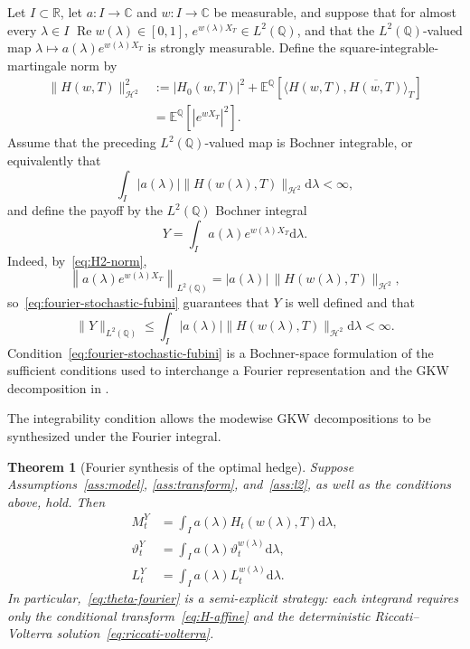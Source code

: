 \documentclass[11pt]{article}
\newtheorem{theorem}{Theorem}[section]
\theoremstyle{definition}
\theoremstyle{remark}
\newcommand{\R}{\mathbb{R}}
\newcommand{\C}{\mathbb{C}}
\newcommand{\E}{\mathbb{E}}
\newcommand{\Q}{\mathbb{Q}}
\newcommand{\1}{\mathbf{1}}
\newcommand{\dd}{\mathrm{d}}
\begin{document}
Let $I\subset\R$, let $a:I\to\C$ and $w:I\to\C$ be measurable, and suppose
that for almost every $\lambda\in I$
$\operatorname{Re}w(\lambda)\in[0,1]$,
$e^{w(\lambda)X_T}\in L^2(\Q)$, and that the $L^2(\Q)$-valued map
$\lambda\mapsto a(\lambda)e^{w(\lambda)X_T}$ is strongly measurable. Define
the square-integrable-martingale norm by
\begin{align}
 \|H(w,T)\|_{\mathcal H^2}^2
 &:=
 |H_0(w,T)|^2+
 \E^\Q\!\left[\langle H(w,T),\overline{H(w,T)}\rangle_T\right]
 \nonumber\\
 &=\E^\Q[|e^{wX_T}|^2].
 \label{eq:H2-norm}
\end{align}
Assume that the preceding $L^2(\Q)$-valued map is Bochner integrable, or
equivalently that
\begin{equation}
\label{eq:fourier-stochastic-fubini}
 \int_I|a(\lambda)|
 \|H(w(\lambda),T)\|_{\mathcal H^2}\dd\lambda<\infty,
\end{equation}
and define the payoff by the $L^2(\Q)$ Bochner integral
\begin{equation}
\label{eq:general-fourier-payoff}
 Y=\int_I a(\lambda)e^{w(\lambda)X_T}\dd\lambda.
\end{equation}
Indeed, by~\eqref{eq:H2-norm},
\begin{equation}
 \left\|a(\lambda)e^{w(\lambda)X_T}\right\|_{L^2(\Q)}
 =|a(\lambda)|\,\|H(w(\lambda),T)\|_{\mathcal H^2},
 \label{eq:fourier-bochner-norm}
\end{equation}
so~\eqref{eq:fourier-stochastic-fubini} guarantees that $Y$ is well defined
and that
\[
 \|Y\|_{L^2(\Q)}
 \leq \int_I |a(\lambda)|
 \|H(w(\lambda),T)\|_{\mathcal H^2}\dd\lambda<\infty.
\]
Condition~\eqref{eq:fourier-stochastic-fubini} is a Bochner-space formulation
of the sufficient conditions used to interchange a Fourier representation and
the GKW decomposition in
\citet[Theorem~4.6 and Remark~4.7]{ditellahauboldkellerressel2019}.

The integrability condition allows the modewise GKW decompositions to be
synthesized under the Fourier integral.

\begin{theorem}[Fourier synthesis of the optimal hedge]
\label{thm:fourier-hedge}
Suppose Assumptions~\ref{ass:model}, \ref{ass:transform}, and~\ref{ass:l2}, as
well as the conditions above, hold. Then
\begin{align}
 M_t^Y&=\int_Ia(\lambda)H_t(w(\lambda),T)\dd\lambda,
 \label{eq:MY-fourier}\\
 \vartheta_t^Y&=\int_Ia(\lambda)\vartheta_t^{w(\lambda)}\dd\lambda,
 \label{eq:theta-fourier}\\
 L_t^Y&=\int_Ia(\lambda)L_t^{w(\lambda)}\dd\lambda.
 \label{eq:L-fourier}
\end{align}
In particular,~\eqref{eq:theta-fourier} is a semi-explicit strategy: each
integrand requires only the conditional transform~\eqref{eq:H-affine} and the
deterministic Riccati--Volterra solution~\eqref{eq:riccati-volterra}.
\end{theorem}
\end{document}
